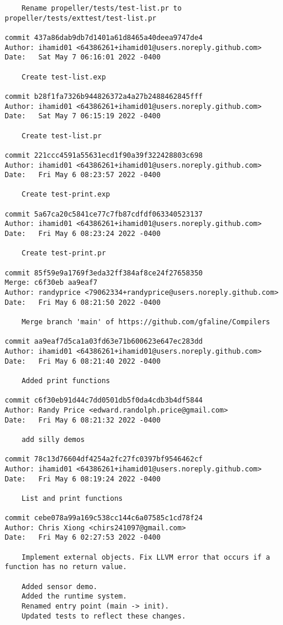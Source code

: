 {\begin{verbatim}
    Rename propeller/tests/test-list.pr to propeller/tests/exttest/test-list.pr

commit 437a86dab9db7d1401a61d8465a40deea9747de4
Author: ihamid01 <64386261+ihamid01@users.noreply.github.com>
Date:   Sat May 7 06:16:01 2022 -0400

    Create test-list.exp

commit b28f1fa7326b944826372a4a27b2488462845fff
Author: ihamid01 <64386261+ihamid01@users.noreply.github.com>
Date:   Sat May 7 06:15:19 2022 -0400

    Create test-list.pr

commit 221ccc4591a55631ecd1f90a39f322428803c698
Author: ihamid01 <64386261+ihamid01@users.noreply.github.com>
Date:   Fri May 6 08:23:57 2022 -0400

    Create test-print.exp

commit 5a67ca20c5841ce77c7fb87cdfdf063340523137
Author: ihamid01 <64386261+ihamid01@users.noreply.github.com>
Date:   Fri May 6 08:23:24 2022 -0400

    Create test-print.pr

commit 85f59e9a1769f3eda32ff384af8ce24f27658350
Merge: c6f30eb aa9eaf7
Author: randyprice <79062334+randyprice@users.noreply.github.com>
Date:   Fri May 6 08:21:50 2022 -0400

    Merge branch 'main' of https://github.com/gfaline/Compilers

commit aa9eaf7d5ca1a03fd63e71b600623e647ec283dd
Author: ihamid01 <64386261+ihamid01@users.noreply.github.com>
Date:   Fri May 6 08:21:40 2022 -0400

    Added print functions

commit c6f30eb91d44c7dd0501db5f0da4cdb3b4df5844
Author: Randy Price <edward.randolph.price@gmail.com>
Date:   Fri May 6 08:21:32 2022 -0400

    add silly demos

commit 78c13d76604df4254a2fc27fc0397bf9546462cf
Author: ihamid01 <64386261+ihamid01@users.noreply.github.com>
Date:   Fri May 6 08:19:24 2022 -0400

    List and print functions

commit cebe078a99a169c538cc144c6a07585c1cd78f24
Author: Chris Xiong <chirs241097@gmail.com>
Date:   Fri May 6 02:27:53 2022 -0400

    Implement external objects. Fix LLVM error that occurs if a function has no return value.
    
    Added sensor demo.
    Added the runtime system.
    Renamed entry point (main -> init).
    Updated tests to reflect these changes.


\end{verbatim}}
